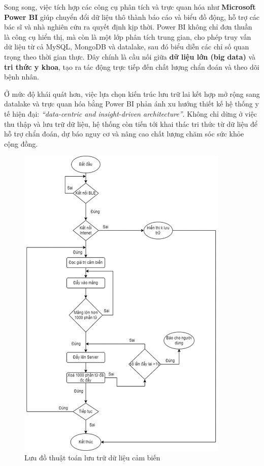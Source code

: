 Song song, việc tích hợp các công cụ phân tích và trực quan hóa như \textbf{Microsoft Power BI} 
giúp chuyển đổi dữ liệu thô thành báo cáo và biểu đồ động, hỗ trợ các bác sĩ và nhà nghiên cứu 
ra quyết định kịp thời. 
Power BI không chỉ đơn thuần là công cụ hiển thị, mà còn là một lớp phân tích trung gian, 
cho phép truy vấn dữ liệu từ cả MySQL, MongoDB và datalake, sau đó biểu diễn các chỉ số quan trọng 
theo thời gian thực. 
Đây chính là cầu nối giữa \textbf{dữ liệu lớn (big data)} và \textbf{tri thức y khoa}, 
tạo ra tác động trực tiếp đến chất lượng chẩn đoán và theo dõi bệnh nhân.

Ở mức độ khái quát hơn, việc lựa chọn kiến trúc lưu trữ lai kết hợp mở rộng sang datalake 
và trực quan hóa bằng Power BI phản ánh xu hướng thiết kế hệ thống y tế hiện đại: 
\textit{“data-centric and insight-driven architecture”}. 
Không chỉ dừng ở việc thu thập và lưu trữ dữ liệu, hệ thống còn tiến tới 
khai thác tri thức từ dữ liệu để hỗ trợ chẩn đoán, dự báo nguy cơ 
và nâng cao chất lượng chăm sóc sức khỏe cộng đồng.

\begin{figure}[htbp]
\centering
\includegraphics[width=0.9\textwidth]{images/flow_http.png}
\caption{Lưu đồ thuật toán lưu trữ dữ liệu cảm biến}
\label{flow_http}
\end{figure}



